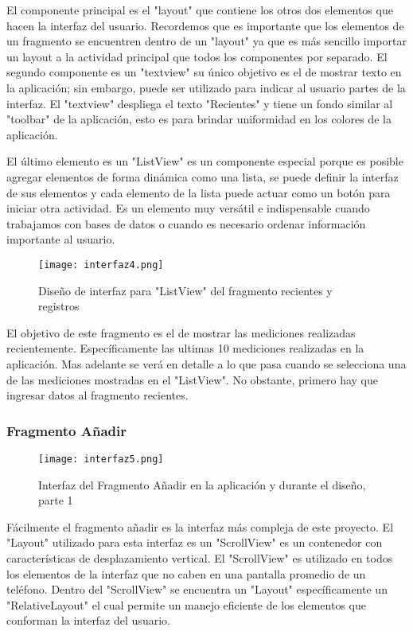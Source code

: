 \par \noindent
El componente principal es el "layout" que contiene los otros dos elementos que hacen la interfaz del usuario. Recordemos que es importante que los elementos de un fragmento se encuentren dentro de un "layout" ya que es más sencillo importar un layout a la actividad principal que todos los componentes por separado. El segundo componente es un "textview" su único objetivo es el de mostrar texto en la aplicación; sin embargo, puede ser utilizado para indicar al usuario partes de la interfaz. El "textview" despliega el texto "Recientes" y tiene un fondo similar al "toolbar" de la aplicación, esto es para brindar uniformidad en los colores de la aplicación. 

\par \noindent
El último elemento es un "ListView" es un componente especial porque es posible agregar elementos de forma dinámica como una lista, se puede definir la interfaz de sus elementos y cada elemento de la lista puede actuar como un botón para iniciar otra actividad. Es un elemento muy versátil e indispensable cuando trabajamos con bases de datos o cuando es necesario ordenar información importante al usuario.

\begin{figure}[H]
	\centering
	\texttt{[image: interfaz4.png]}
	\caption{Diseño de interfaz para "ListView" del fragmento recientes y registros}
\end{figure}

\par \noindent
El objetivo de este fragmento es el de mostrar las mediciones realizadas recientemente. Específicamente las ultimas 10 mediciones realizadas en la aplicación. Mas adelante se verá en detalle a lo que pasa cuando se selecciona una de las mediciones mostradas en el "ListView". No obstante, primero hay que ingresar datos al fragmento recientes. 

\subsubsection{Fragmento Añadir}

\begin{figure}[H]
	\centering
	\texttt{[image: interfaz5.png]}
	\caption{Interfaz del Fragmento Añadir en la aplicación y durante el diseño, parte 1}
\end{figure}

\par 
Fácilmente el fragmento añadir es la interfaz más compleja de este proyecto. El "Layout" utilizado para esta interfaz es un "ScrollView" es un contenedor con características de desplazamiento vertical. El "ScrollView" es utilizado en todos los elementos de la interfaz que no caben en una pantalla promedio de un teléfono. Dentro del "ScrollView" se encuentra un "Layout" específicamente un "RelativeLayout" el cual permite un manejo eficiente de los elementos que conforman la interfaz del usuario. 

